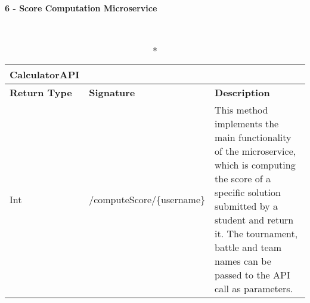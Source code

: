 \vspace{1cm}

\begin{large}{\textbf{6 - Score Computation Microservice}}\end{large}\\

\begin{longtable}{|p{2.5cm} p{6.5cm} p{4.5cm}|}
	\caption*{CalculatorAPI}\\ 
	
	\hline
	\textbf{Return Type} & \textbf{Signature} & \textbf{Description}\\
	\hline \endhead
	
	Int & /computeScore/\{username\} & This method implements the main functionality of the microservice, which is computing the score of a specific solution submitted by a student and return it. The tournament, battle and team names can be passed to the API call as parameters.\\
	
	\hline
	
\end{longtable}
